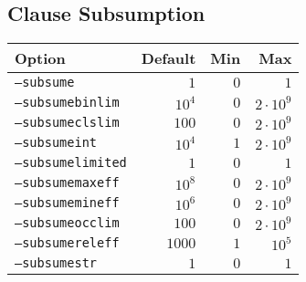 \documentclass{article}
\begin{document}
\subsection{Clause Subsumption}
\begin{tabular}{l|rrr}
    Option & Default & Min & Max \\
    \hline
    \texttt{--subsume}        & $1$    & $0$  & $1$ \\
    \texttt{--subsumebinlim}  & $10^4$ & $0$  & $2 \cdot 10^9$ \\
    \texttt{--subsumeclslim}  & $100$  & $0$  & $2 \cdot 10^9$ \\
    \texttt{--subsumeint}     & $10^4$ & $1$  & $2 \cdot 10^9$ \\
    \texttt{--subsumelimited} & $1$    & $0$  & $1$ \\
    \texttt{--subsumemaxeff}  & $10^8$ & $0$  & $2 \cdot 10^9$ \\
    \texttt{--subsumemineff}  & $10^6$ & $0$  & $2 \cdot 10^9$ \\
    \texttt{--subsumeocclim}  & $100$  & $0$  & $2 \cdot 10^9$ \\
    \texttt{--subsumereleff}  & $1000$ & $1$  & $10^5$ \\
    \texttt{--subsumestr}     & $1$    & $0$  & $1$ \\
\end{tabular}
\end{document}
